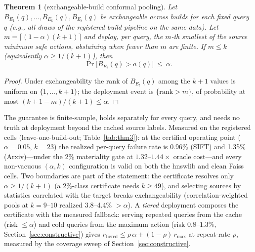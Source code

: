 \documentclass{article}
\newtheorem{theorem}{Theorem}
\renewcommand{\Pr}{\mathop{\mathrm{Pr}}}   %
\begin{document}
\begin{theorem}[exchangeable-build conformal pooling]
Let $B_{E_1}(q),\dots,B_{E_k}(q),B_{E_t}(q)$ be exchangeable across builds for each
fixed query $q$ (e.g., all draws of the registered build pipeline on the same data).
Let $m=\lceil(1-\alpha)(k+1)\rceil$ and deploy, per query, the $m$-th smallest of the
source minimum safe actions, abstaining when fewer than $m$ are finite. If
$m\le k$ (equivalently $\alpha\ge 1/(k+1)$), then
\begin{equation}
\Pr\bigl[B_{E_t}(q)>a(q)\bigr]\ \le\ \alpha.
\label{eq:thm3}
\end{equation}
\end{theorem}

\begin{proof}
Under exchangeability the rank of $B_{E_t}(q)$ among the $k{+}1$ values is uniform on
$\{1,\dots,k{+}1\}$; the deployment event is $\{\mathrm{rank}>m\}$, of probability at
most $(k{+}1-m)/(k{+}1)\le\alpha$.
\end{proof}

The guarantee is finite-sample, holds separately for every query, and needs no truth at
deployment beyond the cached source labels. Measured on the registered cells
(leave-one-build-out; Table~\ref{tab:thm3}): at the certified operating point
($\alpha{=}0.05$, $k{=}23$) the realized per-query failure rate is 0.96\% (SIFT) and
1.35\% (Arxiv)---under the 2\% materiality gate at $1.32$--$1.44\times$ oracle
cost---and every non-vacuous $(\alpha,k)$ configuration is valid on both the hnswlib
and clean Faiss cells. Two boundaries are part of the statement: the certificate
resolves only $\alpha\ge 1/(k+1)$ (a 2\%-class certificate needs $k\ge 49$), and
selecting sources by statistics correlated with the target breaks exchangeability
(correlation-weighted pools at $k{=}9$--$10$ realized 3.8--4.4\% $>\alpha$).
A \emph{tiered} deployment composes the certificate with the measured fallback: serving
repeated queries from the cache (risk $\le\alpha$) and cold queries from the maximum
action (risk $0.8$--$1.3\%$, Section~\ref{sec:constructive}) gives
$r_{\mathrm{tiered}}\le\rho\,\alpha+(1-\rho)\,r_{\max}$ at repeat-rate $\rho$,
measured by the coverage sweep of Section~\ref{sec:constructive}.
\end{document}

